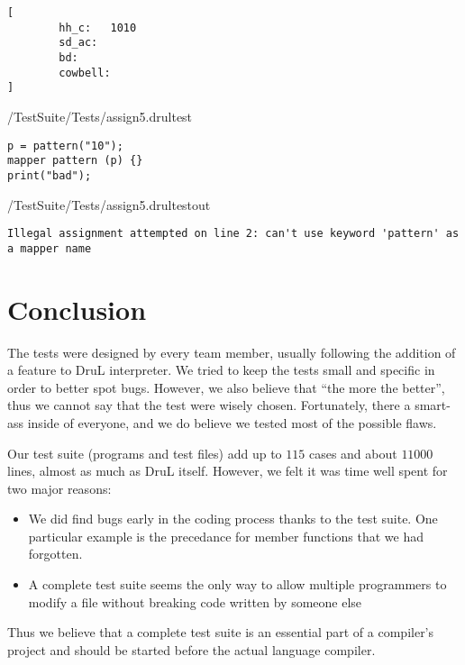 \begin{lstlisting} 
[
        hh_c:   1010
        sd_ac:
        bd:
        cowbell:
]
\end{lstlisting}




/TestSuite/Tests/assign5.drultest
\begin{lstlisting}
p = pattern("10");
mapper pattern (p) {}
print("bad");
\end{lstlisting}

/TestSuite/Tests/assign5.drultestout
\begin{lstlisting}
Illegal assignment attempted on line 2: can't use keyword 'pattern' as a mapper name
\end{lstlisting}




\section{Conclusion}
The tests were designed by every team member, usually following the addition
of a feature to DruL interpreter. We tried to keep the tests small and specific
in order to better spot bugs. However, we also believe that ``the more the
better'', thus we cannot say that the test were wisely chosen. Fortunately,
there a smart-ass inside of everyone, and we do believe we tested most of
the possible flaws.

Our test suite (programs and test files) add up to $115$ cases and 
about $11000$ lines, almost
as much as DruL itself. However, we felt it was time well spent for two major
reasons:
\begin{itemize}
\item We did find bugs early in the coding process thanks to the test suite. One
particular example is the precedance for member functions that we had forgotten.
\item A complete test suite seems the only way to allow multiple programmers to
modify a file without breaking code written by someone else
\end{itemize}
Thus we believe that a complete test suite is an essential part of a compiler's
project and should be started before the actual language compiler.

